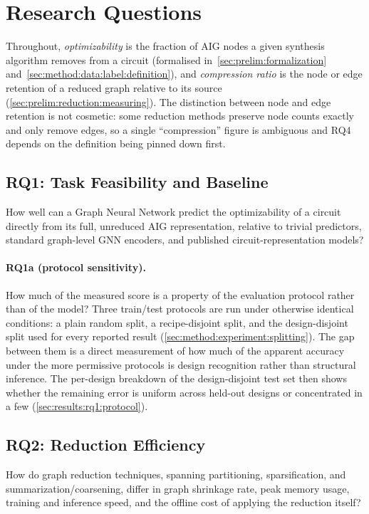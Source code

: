 \section{Research Questions}
\label{sec:intro:rqs}
Throughout, \emph{optimizability} is the fraction of AIG nodes a given synthesis algorithm
removes from a circuit (formalised in~\ref{sec:prelim:formalization}
and~\ref{sec:method:data:label:definition}), and \emph{compression ratio} is the node or edge
retention of a reduced graph relative to its source
(\ref{sec:prelim:reduction:measuring}). The distinction between node and edge retention is
not cosmetic: some reduction methods preserve node counts exactly and only remove edges, so
a single ``compression'' figure is ambiguous and RQ4 depends on the definition being pinned
down first.

\subsection{RQ1: Task Feasibility and Baseline}
\label{sec:intro:rq1}
How well can a Graph Neural Network predict the optimizability of a circuit directly from
its full, unreduced AIG representation, relative to trivial predictors, standard graph-level
GNN encoders, and published circuit-representation models?

\paragraph{RQ1a (protocol sensitivity).}
How much of the measured score is a property of the evaluation protocol rather than of the
model? Three train/test protocols are run under otherwise identical conditions: a plain
random split, a recipe-disjoint split, and the design-disjoint split used for every reported
result (\ref{sec:method:experiment:splitting}). The gap between them is a direct
measurement of how much of the apparent accuracy under the more permissive protocols is
design recognition rather than structural inference. The per-design breakdown of the
design-disjoint test set then shows whether the remaining error is uniform across held-out
designs or concentrated in a few (\ref{sec:results:rq1:protocol}).

\subsection{RQ2: Reduction Efficiency}
\label{sec:intro:rq2}
How do graph reduction techniques, spanning partitioning, sparsification, and
summarization/coarsening, differ in graph shrinkage rate, peak memory usage,
training and inference speed, and the offline cost of applying the reduction itself?

